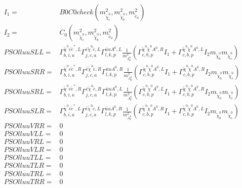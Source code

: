\documentclass[A4,landscape]{article}
\begin{document}
\begin{align} 
I_1= & B0C0check(m^2_{\tilde{\chi}^0_{{c}}}, m^2_{\tilde{\chi}^0_{{b}}}, m^2_{\tilde{e}_{{a}}}) \\ 
I_2= & C_0(m^2_{\tilde{\chi}^0_{{c}}}, m^2_{\tilde{\chi}^0_{{b}}}, m^2_{\tilde{e}_{{a}}}) \\ 
  PSOlluuSLL= &  \Gamma^{\tilde{\chi}^0 e \tilde{e}^*,L}_{b, i, a} \Gamma^{\bar{e}\tilde{\chi}^0 \tilde{e} ,L}_{j, c, a} \Gamma^{\bar{u}u A^0 ,L}_{l, k, p} \frac{1}{m^2_{A^0_{{p}}}} (\Gamma^{\tilde{\chi}^0 \tilde{\chi}^0 A^0 ,R}_{c, b, p} I_1 + \Gamma^{\tilde{\chi}^0 \tilde{\chi}^0 A^0 ,L}_{c, b, p} I_2 m_{\tilde{\chi}^0_{{b}}} m_{\tilde{\chi}^0_{{c}}}) \\ 
  PSOlluuSRR= &  \Gamma^{\tilde{\chi}^0 e \tilde{e}^*,R}_{b, i, a} \Gamma^{\bar{e}\tilde{\chi}^0 \tilde{e} ,R}_{j, c, a} \Gamma^{\bar{u}u A^0 ,R}_{l, k, p} \frac{1}{m^2_{A^0_{{p}}}} (\Gamma^{\tilde{\chi}^0 \tilde{\chi}^0 A^0 ,L}_{c, b, p} I_1 + \Gamma^{\tilde{\chi}^0 \tilde{\chi}^0 A^0 ,R}_{c, b, p} I_2 m_{\tilde{\chi}^0_{{b}}} m_{\tilde{\chi}^0_{{c}}}) \\ 
  PSOlluuSRL= &  \Gamma^{\tilde{\chi}^0 e \tilde{e}^*,R}_{b, i, a} \Gamma^{\bar{e}\tilde{\chi}^0 \tilde{e} ,R}_{j, c, a} \Gamma^{\bar{u}u A^0 ,L}_{l, k, p} \frac{1}{m^2_{A^0_{{p}}}} (\Gamma^{\tilde{\chi}^0 \tilde{\chi}^0 A^0 ,L}_{c, b, p} I_1 + \Gamma^{\tilde{\chi}^0 \tilde{\chi}^0 A^0 ,R}_{c, b, p} I_2 m_{\tilde{\chi}^0_{{b}}} m_{\tilde{\chi}^0_{{c}}}) \\ 
  PSOlluuSLR= &  \Gamma^{\tilde{\chi}^0 e \tilde{e}^*,L}_{b, i, a} \Gamma^{\bar{e}\tilde{\chi}^0 \tilde{e} ,L}_{j, c, a} \Gamma^{\bar{u}u A^0 ,R}_{l, k, p} \frac{1}{m^2_{A^0_{{p}}}} (\Gamma^{\tilde{\chi}^0 \tilde{\chi}^0 A^0 ,R}_{c, b, p} I_1 + \Gamma^{\tilde{\chi}^0 \tilde{\chi}^0 A^0 ,L}_{c, b, p} I_2 m_{\tilde{\chi}^0_{{b}}} m_{\tilde{\chi}^0_{{c}}}) \\ 
  PSOlluuVRR= & 0 \\ 
  PSOlluuVLL= & 0 \\ 
  PSOlluuVRL= & 0 \\ 
  PSOlluuVLR= & 0 \\ 
  PSOlluuTLL= & 0 \\ 
  PSOlluuTLR= & 0 \\ 
  PSOlluuTRL= & 0 \\ 
  PSOlluuTRR= & 0 \\ 
\end{align} 
\end{document}

